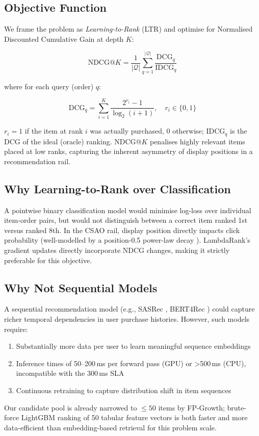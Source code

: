 \documentclass[conference]{IEEEtran}
\begin{document}
\subsection{Objective Function}

We frame the problem as \emph{Learning-to-Rank} (LTR) and optimise for
Normalised Discounted Cumulative Gain at depth $K$:

\begin{equation}
  \text{NDCG}@K = \frac{1}{|\mathcal{Q}|}
  \sum_{q=1}^{|\mathcal{Q}|} \frac{\text{DCG}_q}{\text{IDCG}_q}
\end{equation}

where for each query (order) $q$:

\begin{equation}
  \text{DCG}_q = \sum_{i=1}^{K} \frac{2^{r_i} - 1}{\log_2(i+1)},
  \quad r_i \in \{0,1\}
\end{equation}

$r_i = 1$ if the item at rank $i$ was actually purchased, $0$ otherwise;
$\text{IDCG}_q$ is the DCG of the ideal (oracle) ranking. NDCG@$K$ penalises
highly relevant items placed at low ranks, capturing the inherent asymmetry of
display positions in a recommendation rail.

\subsection{Why Learning-to-Rank over Classification}

A pointwise binary classification model would minimise log-loss over individual
item-order pairs, but would not distinguish between a correct item ranked 1st
versus ranked 8th. In the CSAO rail, display position directly impacts click
probability (well-modelled by a position-0.5 power-law decay
\cite{joachims2017, craswell2008}). LambdaRank's gradient updates directly
incorporate NDCG changes, making it strictly preferable for this objective.

\subsection{Why Not Sequential Models}

A sequential recommendation model (e.g., SASRec \cite{kang2018self}, BERT4Rec
\cite{sun2019bert4rec}) could capture richer temporal dependencies in user
purchase histories. However, such models require:
\begin{enumerate}
  \item Substantially more data per user to learn meaningful sequence embeddings
  \item Inference times of 50--200\,ms per forward pass (GPU) or >500\,ms (CPU),
        incompatible with the 300\,ms SLA
  \item Continuous retraining to capture distribution shift in item sequences
\end{enumerate}
Our candidate pool is already narrowed to $\leq 50$ items by FP-Growth;
brute-force LightGBM ranking of 50 tabular feature vectors is both faster and
more data-efficient than embedding-based retrieval for this problem scale.
\end{document}
